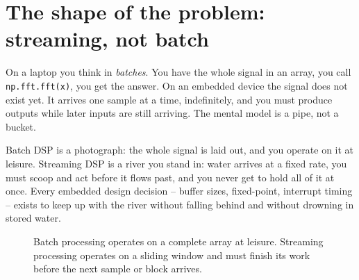 \section{The shape of the problem: streaming, not batch}
\label{ch40:streaming}

On a laptop you think in \emph{batches}. You have the whole signal in an array, you call
\texttt{np.fft.fft(x)}, you get the answer. On an embedded device the signal does not exist yet.
It arrives one sample at a time, indefinitely, and you must produce outputs while later inputs
are still arriving. The mental model is a pipe, not a bucket.

\begin{intuitionbox}
Batch DSP is a photograph: the whole signal is laid out, and you operate on it at leisure.
Streaming DSP is a river you stand in: water arrives at a fixed rate, you must scoop and act
before it flows past, and you never get to hold all of it at once. Every embedded design decision
-- buffer sizes, fixed-point, interrupt timing -- exists to keep up with the river without falling
behind and without drowning in stored water.
\end{intuitionbox}

\begin{figure}[htbp]
\centering
{}
\caption{Batch processing operates on a complete array at leisure. Streaming processing operates on a sliding window and must finish its work before the next sample or block arrives.}
\label{fig:batch-vs-streaming}
\end{figure}


